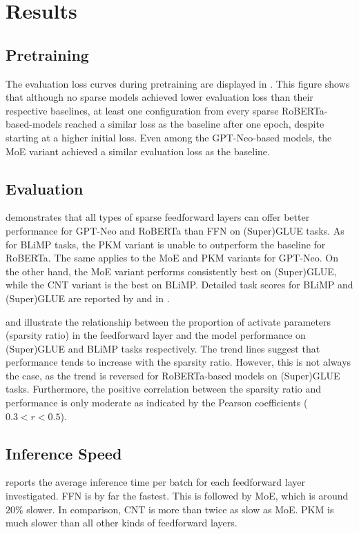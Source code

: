\section{Results}
\label{sec:results}
\subsection{Pretraining}
The evaluation loss curves during pretraining are displayed in . This figure shows that although no sparse models achieved lower evaluation loss than their respective baselines, at least one configuration from every sparse RoBERTa-based-models reached a similar loss as the baseline after one epoch, despite starting at a higher initial loss. Even among the GPT-Neo-based models, the MoE variant achieved a similar evaluation loss as the baseline.
\subsection{Evaluation}
 demonstrates that all types of sparse feedforward layers can offer better performance for GPT-Neo and RoBERTa than FFN on (Super)GLUE tasks. As for BLiMP tasks, the PKM variant is unable to outperform the baseline for RoBERTa. The same applies to the MoE and PKM variants for GPT-Neo. On the other hand, the MoE variant performs consistently best on (Super)GLUE, while the CNT variant is the best on BLiMP. Detailed task scores for BLiMP and (Super)GLUE are reported by  and  in .

 and  illustrate the relationship between the proportion of activate parameters (sparsity ratio) in the feedforward layer and the model performance on (Super)GLUE and BLiMP tasks respectively. The trend lines suggest that performance tends to increase with the sparsity ratio. However, this is not always the case, as the trend is reversed for RoBERTa-based models on (Super)GLUE tasks. Furthermore, the positive correlation between the sparsity ratio and performance is only moderate as indicated by the Pearson coefficients ($0.3 < r < 0.5$).
\subsection{Inference Speed}
 reports the average inference time per batch for each feedforward layer investigated. FFN is by far the fastest. This is followed by MoE, which is around $20\%$ slower. In comparison, CNT is more than twice as slow as MoE. PKM is much slower than all other kinds of feedforward layers.

